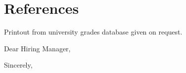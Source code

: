 \documentclass[11pt,a4paper,sans]{moderncv}        %
\begin{document}
\section{References}
Printout from university grades database given on request.


%


\clearpage
\date{\today}
\opening{Dear Hiring Manager,}
\closing{Sincerely,}
\makelettertitle


\enlargethispage{3\baselineskip}

\makeletterclosing

\end{document}
